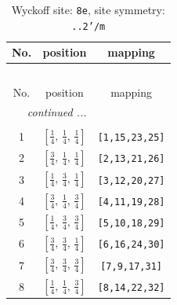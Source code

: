 \documentclass[fleqn,8pt]{jsarticle}
\begin{document}
\renewcommand{\arraystretch}{1.2}
\begin{longtable}{ccc}
\caption{Wyckoff site: {\tt 8e}, site symmetry: {\tt ..2'/m}}
 \\
 \hline \hline
No. & position & mapping \\ \hline \endfirsthead

\multicolumn{2}{l}{\tablename\ \thetable{}} \\
 \hline \hline
No. & position & mapping \\ \hline \endhead

 \hline \hline
\multicolumn{2}{r}{\footnotesize\it continued ...} \\ \endfoot

 \hline \hline
\multicolumn{2}{r}{} \\ \endlastfoot

1 & $\left[ \frac{1}{4},\, \frac{1}{4},\, \frac{1}{4} \right]$ & {\tt [1,15,23,25]} \\ \hline
2 & $\left[ \frac{3}{4},\, \frac{1}{4},\, \frac{1}{4} \right]$ & {\tt [2,13,21,26]} \\ \hline
3 & $\left[ \frac{1}{4},\, \frac{3}{4},\, \frac{1}{4} \right]$ & {\tt [3,12,20,27]} \\ \hline
4 & $\left[ \frac{3}{4},\, \frac{1}{4},\, \frac{3}{4} \right]$ & {\tt [4,11,19,28]} \\ \hline
5 & $\left[ \frac{1}{4},\, \frac{3}{4},\, \frac{3}{4} \right]$ & {\tt [5,10,18,29]} \\ \hline
6 & $\left[ \frac{3}{4},\, \frac{3}{4},\, \frac{1}{4} \right]$ & {\tt [6,16,24,30]} \\ \hline
7 & $\left[ \frac{3}{4},\, \frac{3}{4},\, \frac{3}{4} \right]$ & {\tt [7,9,17,31]} \\ \hline
8 & $\left[ \frac{1}{4},\, \frac{1}{4},\, \frac{3}{4} \right]$ & {\tt [8,14,22,32]} \\
\end{longtable}
\renewcommand{\arraystretch}{1.2}
\end{document}
